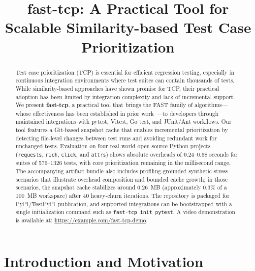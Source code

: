 \documentclass[10pt,conference]{IEEEtran}
\begin{document}
\title{fast-tcp: A Practical Tool for Scalable Similarity-based Test Case Prioritization}

\author{
}

\maketitle

\begin{abstract}
Test case prioritization (TCP) is essential for efficient regression testing, especially in continuous integration environments where test suites can contain thousands of tests. While similarity-based approaches have shown promise for TCP, their practical adoption has been limited by integration complexity and lack of incremental support. We present \textbf{fast-tcp}, a practical tool that brings the FAST family of algorithms---whose effectiveness has been established in prior work~\cite{miranda2018fast}---to developers through maintained integrations with pytest, Vitest, Go test, and JUnit/Ant workflows. Our tool features a Git-based snapshot cache that enables incremental prioritization by detecting file-level changes between test runs and avoiding redundant work for unchanged tests. Evaluation on four real-world open-source Python projects (\texttt{requests}, \texttt{rich}, \texttt{click}, and \texttt{attrs}) shows absolute overheads of 0.24--0.68 seconds for suites of 576--1326 tests, with core prioritization remaining in the millisecond range. The accompanying artifact bundle also includes profiling-grounded synthetic stress scenarios that illustrate overhead composition and bounded cache growth; in those scenarios, the snapshot cache stabilizes around 0.26~MB (approximately 0.3\% of a 100~MB workspace) after 40 heavy-churn iterations. The repository is packaged for PyPI/TestPyPI publication, and supported integrations can be bootstrapped with a single initialization command such as \texttt{fast-tcp init pytest}. A video demonstration is available at: \url{https://example.com/fast-tcp-demo}.
\end{abstract}

\section{Introduction and Motivation}
\end{document}
